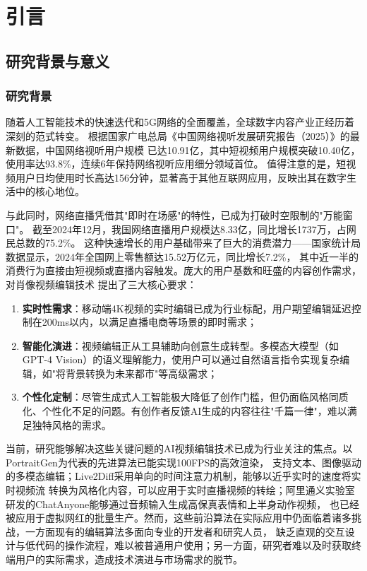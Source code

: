 
\chapter{引言}

\section{研究背景与意义}

\subsection{研究背景}

随着人工智能技术的快速迭代和5G网络的全面覆盖，全球数字内容产业正经历着深刻的范式转变。
根据国家广电总局《中国网络视听发展研究报告（2025）》的最新数据，中国网络视听用户规模
已达10.91亿，其中短视频用户规模突破10.40亿，使用率达93.8\%，连续6年保持网络视听应用细分领域首位。
值得注意的是，短视频用户日均使用时长高达156分钟，显著高于其他互联网应用，反映出其在数字生活中的核心地位。

与此同时，网络直播凭借其"即时在场感"的特性，已成为打破时空限制的"万能窗口"。
截至2024年12月，我国网络直播用户规模达8.33亿，同比增长1737万，占网民总数的75.2\%。
这种快速增长的用户基础带来了巨大的消费潜力——国家统计局数据显示，2024年全国网上零售额达15.52万亿元，同比增长7.2\%，
其中近一半的消费行为直接由短视频或直播内容触发。庞大的用户基数和旺盛的内容创作需求，对肖像视频编辑技术
提出了三大核心要求：
\begin{enumerate}
    \item \textbf{实时性需求}：移动端4K视频的实时编辑已成为行业标配，用户期望编辑延迟控制在200ms以内，以满足直播电商等场景的即时需求；
    \item \textbf{智能化演进}：视频编辑正从工具辅助向创意生成转型。多模态大模型（如GPT-4 Vision）的语义理解能力，使用户可以通过自然语言指令实现复杂编辑，如"将背景转换为未来都市"等高级需求；
    \item \textbf{个性化定制}：尽管生成式人工智能极大降低了创作门槛，但仍面临风格同质化、个性化不足的问题。有创作者反馈AI生成的内容往往"千篇一律"，难以满足独特风格的需求。
\end{enumerate}

当前，研究能够解决这些关键问题的AI视频编辑技术已成为行业关注的焦点。以PortraitGen为代表的先进算法已能实现100FPS的高效渲染，
支持文本、图像驱动的多模态编辑；Live2Diff采用单向的时间注意力机制，能够以近乎实时的速度将实时视频流
转换为风格化内容，可以应用于实时直播视频的转绘；阿里通义实验室研发的ChatAnyone能够通过音频输入生成高保真表情和上半身动作视频，
也已经被应用于虚拟网红的批量生产。然而，这些前沿算法在实际应用中仍面临着诸多挑战，一方面现有的编辑算法多面向专业的开发者和研究人员，
缺乏直观的交互设计与低代码的操作流程，难以被普通用户使用；另一方面，研究者难以及时获取终端用户的实际需求，造成技术演进与市场需求的脱节。

